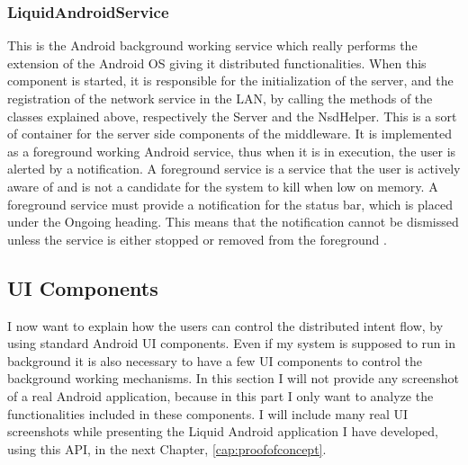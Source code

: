 \subsubsection{LiquidAndroidService}
This is the Android background working service which really performs the extension of the Android OS giving it distributed functionalities. When this component is started, it is responsible for the initialization of the server, and the registration of the network service in the LAN, by calling the methods of the classes explained above, respectively the Server and the NsdHelper. This is a sort of container for the server side components of the middleware. It is implemented as a foreground working Android service, thus when it is in execution, the user is alerted by a notification. A foreground service is a service that the user is actively aware of and is not a candidate for the system to kill when low on memory. A foreground service must provide a notification for the status bar, which is placed under the Ongoing heading. This means that the notification cannot be dismissed unless the service is either stopped or removed from the foreground \cite{devandroidrunning}.
\subsection{UI Components}
I now want to explain how the users can control the distributed intent flow, by using standard Android UI components. Even if my system is supposed to run in background it is also necessary to have a few UI components to control the background working mechanisms. In this section I will not provide any screenshot of a real Android application, because in this part I only want to analyze the functionalities included in these components. I will include many real UI screenshots while presenting the Liquid Android application I have developed, using this API, in the next Chapter, \ref{cap:proofofconcept}.
